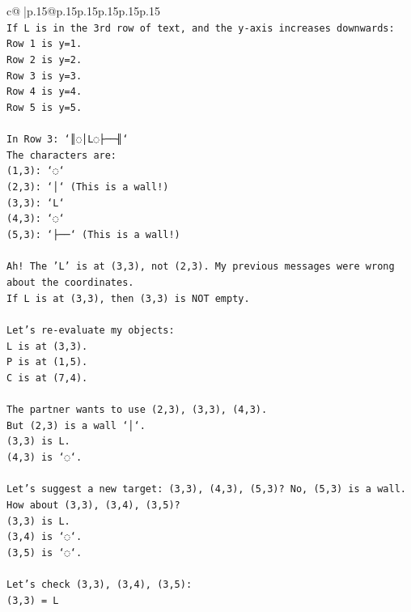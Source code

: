 \documentclass{article}
\begin{document}
{\begin{supertabular}{c@{$\;$}|p{.15\linewidth}@{}p{.15\linewidth}p{.15\linewidth}p{.15\linewidth}p{.15\linewidth}p{.15\linewidth}}
{{{\\ 
\texttt{If L is in the 3rd row of text, and the y{-}axis increases downwards:} \\
\texttt{Row 1 is y=1.} \\
\texttt{Row 2 is y=2.} \\
\texttt{Row 3 is y=3.} \\
\texttt{Row 4 is y=4.} \\
\texttt{Row 5 is y=5.} \\
\\ 
\texttt{In Row 3: `║◌│L◌├──╢`} \\
\texttt{The characters are:} \\
\texttt{(1,3): `◌`} \\
\texttt{(2,3): `│` (This is a wall!)} \\
\texttt{(3,3): `L`} \\
\texttt{(4,3): `◌`} \\
\texttt{(5,3): `├──` (This is a wall!)} \\
\\ 
\texttt{Ah! The 'L' is at (3,3), not (2,3). My previous messages were wrong about the coordinates.} \\
\texttt{If L is at (3,3), then (3,3) is NOT empty.} \\
\\ 
\texttt{Let's re{-}evaluate my objects:} \\
\texttt{L is at (3,3).} \\
\texttt{P is at (1,5).} \\
\texttt{C is at (7,4).} \\
\\ 
\texttt{The partner wants to use (2,3), (3,3), (4,3).} \\
\texttt{But (2,3) is a wall `│`.} \\
\texttt{(3,3) is L.} \\
\texttt{(4,3) is `◌`.} \\
\\ 
\texttt{Let's suggest a new target: (3,3), (4,3), (5,3)? No, (5,3) is a wall.} \\
\texttt{How about (3,3), (3,4), (3,5)?} \\
\texttt{(3,3) is L.} \\
\texttt{(3,4) is `◌`.} \\
\texttt{(3,5) is `◌`.} \\
\\ 
\texttt{Let's check (3,3), (3,4), (3,5):} \\
\texttt{(3,3) = L} \\
}}}
\end{supertabular}}
\end{document}
